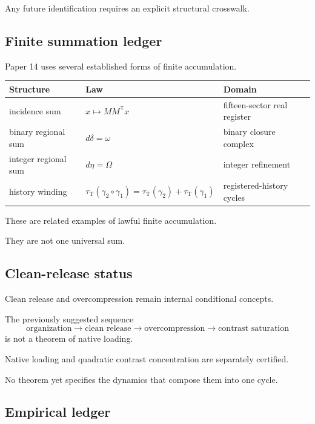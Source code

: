 Any future identification requires an explicit structural crosswalk.

\subsection{Finite summation ledger}

Paper 14 uses several established forms of finite accumulation.

\begin{center}
\begin{tabular}{p{} p{} p{}}
\toprule
Structure & Law & Domain\\
\midrule

incidence sum &
\(x\mapsto MM^{\mathsf T}x\) &
fifteen-sector real register\\

binary regional sum &
\(d\delta=\omega\) &
binary closure complex\\

integer regional sum &
\(d\eta=\Omega\) &
integer refinement\\

history winding &
\(\tau_{\mathrm T}(\gamma_2\circ\gamma_1)
=
\tau_{\mathrm T}(\gamma_2)+
\tau_{\mathrm T}(\gamma_1)\) &
registered-history cycles\\

\bottomrule
\end{tabular}
\end{center}

These are related examples of lawful finite accumulation.

They are not one universal sum.

\subsection{Clean-release status}

Clean release and overcompression remain internal conditional
concepts.

The previously suggested sequence
\[
\text{organization}
\to
\text{clean release}
\to
\text{overcompression}
\to
\text{contrast saturation}
\]
is not a theorem of native loading.

Native loading and quadratic contrast concentration are separately
certified.

No theorem yet specifies the dynamics that compose them into one
cycle.

\subsection{Empirical ledger}

